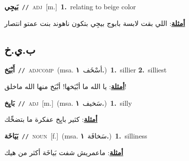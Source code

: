 \documentclass[10pt,a4paper,twoside]{article} %
\begin{document}
\begin{multicols}{2}
{\setlength\topsep{0pt}\textbf{\foreignlanguage{arabic}{بَيجِي}}\ {\color{gray}\texttt{//}\color{black}}\ \textsc{adj}\ [m.]\ \textbf{1.}~relating to beige color\  \begin{flushright}\color{gray}\foreignlanguage{arabic}{\textbf{\underline{\foreignlanguage{arabic}{أمثلة}}}: اللي بقت لابسة بابوج بيجِي بتكون ناهوند بنت عمتو انتصار}\end{flushright}\color{black}} \vspace{2mm}

\vspace{-3mm}
\subsection*{\color{blue}\foreignlanguage{arabic}{ب.ي.خ}\color{blue}{}} 

{\setlength\topsep{0pt}\textbf{\foreignlanguage{arabic}{أَبْيَخ}}\ {\color{gray}\texttt{//}\color{black}}\ \textsc{adj\textunderscore comp}\ \color{gray}(msa. \foreignlanguage{arabic}{أسْخَف}~\foreignlanguage{arabic}{\textbf{١.}})\color{black}\ \textbf{1.}~sillier  \textbf{2.}~silliest\  \begin{flushright}\color{gray}\foreignlanguage{arabic}{\textbf{\underline{\foreignlanguage{arabic}{أمثلة}}}: يا الله ما أبْيَخها! أبْيَخ منها الله ماخلق!}\end{flushright}\color{black}} \vspace{2mm}

{\setlength\topsep{0pt}\textbf{\foreignlanguage{arabic}{بَايِخ}}\ {\color{gray}\texttt{//}\color{black}}\ \textsc{adj}\ [m.]\ \color{gray}(msa. \foreignlanguage{arabic}{سَخيف}~\foreignlanguage{arabic}{\textbf{١.}})\color{black}\ \textbf{1.}~silly\  \begin{flushright}\color{gray}\foreignlanguage{arabic}{\textbf{\underline{\foreignlanguage{arabic}{أمثلة}}}: كثير بايِخ عفكرة ما بتضحِّك}\end{flushright}\color{black}} \vspace{2mm}

{\setlength\topsep{0pt}\textbf{\foreignlanguage{arabic}{بَيَاخَة}}\ {\color{gray}\texttt{//}\color{black}}\ \textsc{noun}\ [f.]\ \color{gray}(msa. \foreignlanguage{arabic}{سَخافَة}~\foreignlanguage{arabic}{\textbf{١.}})\color{black}\ \textbf{1.}~silliness\  \begin{flushright}\color{gray}\foreignlanguage{arabic}{\textbf{\underline{\foreignlanguage{arabic}{أمثلة}}}: ماعمريش شفت بَياخَة أكثر من هيك}\end{flushright}\color{black}} \vspace{2mm}


\end{multicols}
\end{document}
